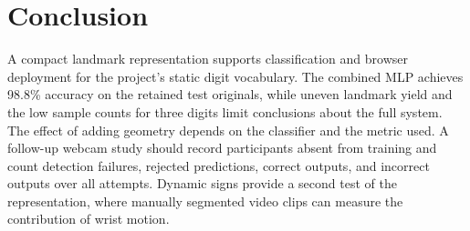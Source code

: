 \section{Conclusion}
\label{sec:conclusion}

A compact landmark representation supports classification and browser
deployment for the project's static digit vocabulary. The combined MLP
achieves 98.8\% accuracy on the retained test originals, while uneven
landmark yield and the low sample counts for three digits limit conclusions
about the full system. The effect of adding geometry depends on the
classifier and the metric used. A follow-up webcam study should record
participants absent from training and count detection failures, rejected
predictions, correct outputs, and incorrect outputs over all attempts.
Dynamic signs provide a second test of the representation, where manually
segmented video clips can measure the contribution of wrist motion.
